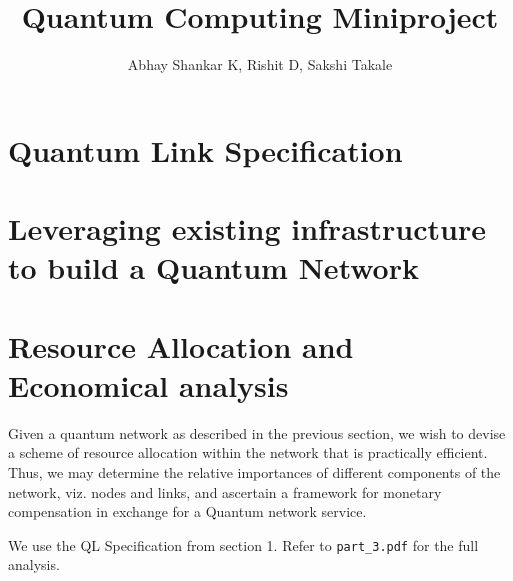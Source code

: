 \documentclass{amsart}
\begin{document}
    \title{Quantum Computing Miniproject}
    \author{Abhay Shankar K, Rishit D, Sakshi Takale}
    \maketitle

    \section{Quantum Link Specification}
    \section{Leveraging existing infrastructure to build a Quantum Network}
    \section{Resource Allocation and Economical analysis}

    Given a quantum network as described in the previous section, we wish to devise a scheme of resource allocation within the network that is practically efficient. Thus, we may determine the relative importances of different components of the network, viz. nodes and links, and ascertain a framework for monetary compensation in exchange for a Quantum network service.
    
    We use the QL Specification from section 1. Refer to \texttt{part\_3.pdf} for the full analysis.
\end{document}

